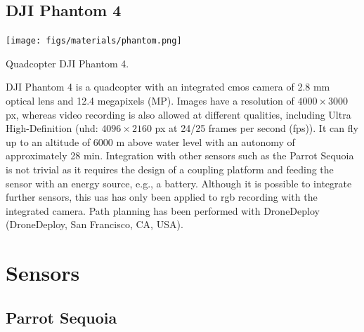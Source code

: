 \subsection{DJI Phantom 4}

\begin{marginfigure}[.1cm]
	\texttt{[image: figs/materials/phantom.png]}
	\caption{Quadcopter DJI Phantom 4.}
	\label{fig:dji_phantom4}
\end{marginfigure}
DJI Phantom 4 is a quadcopter with an integrated \acrshort{cmos} camera of 2.8 \si{\milli\meter} optical lens and 12.4 megapixels (MP). Images have a resolution of $4000 \times 3000$ px, whereas video recording is also allowed at different qualities, including Ultra High-Definition (\acrshort{uhd}: $4096 \times 2160$ px at 24/25 frames per second (\acrshort{fps})). It can fly up to an altitude of 6000 \si{\meter} above water level with an autonomy of approximately 28 \si{\minute}. Integration with other sensors such as the Parrot Sequoia is not trivial as it requires the design of a coupling platform and feeding the sensor with an energy source, e.g., a battery. Although it is possible to integrate further sensors, this \acrshort{uas} has only been applied to \acrshort{rgb} recording with the integrated camera. Path planning has been performed with DroneDeploy (DroneDeploy, San Francisco, CA, USA).

\section{Sensors}

\subsection{Parrot Sequoia}

